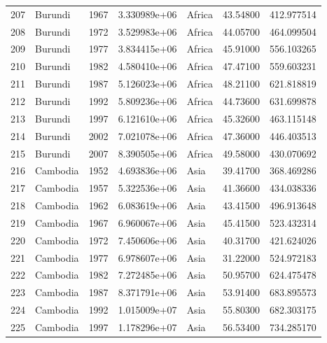 \documentclass[
  letterpaper,
  DIV=11,
  numbers=noendperiod]{scrreprt}
\begin{document}
\begin{tabular}{llrrlrr}
207  &                   Burundi &  1967 &  3.330989e+06 &    Africa &  43.54800 &     412.977514 \\
208  &                   Burundi &  1972 &  3.529983e+06 &    Africa &  44.05700 &     464.099504 \\
209  &                   Burundi &  1977 &  3.834415e+06 &    Africa &  45.91000 &     556.103265 \\
210  &                   Burundi &  1982 &  4.580410e+06 &    Africa &  47.47100 &     559.603231 \\
211  &                   Burundi &  1987 &  5.126023e+06 &    Africa &  48.21100 &     621.818819 \\
212  &                   Burundi &  1992 &  5.809236e+06 &    Africa &  44.73600 &     631.699878 \\
213  &                   Burundi &  1997 &  6.121610e+06 &    Africa &  45.32600 &     463.115148 \\
214  &                   Burundi &  2002 &  7.021078e+06 &    Africa &  47.36000 &     446.403513 \\
215  &                   Burundi &  2007 &  8.390505e+06 &    Africa &  49.58000 &     430.070692 \\
216  &                  Cambodia &  1952 &  4.693836e+06 &      Asia &  39.41700 &     368.469286 \\
217  &                  Cambodia &  1957 &  5.322536e+06 &      Asia &  41.36600 &     434.038336 \\
218  &                  Cambodia &  1962 &  6.083619e+06 &      Asia &  43.41500 &     496.913648 \\
219  &                  Cambodia &  1967 &  6.960067e+06 &      Asia &  45.41500 &     523.432314 \\
220  &                  Cambodia &  1972 &  7.450606e+06 &      Asia &  40.31700 &     421.624026 \\
221  &                  Cambodia &  1977 &  6.978607e+06 &      Asia &  31.22000 &     524.972183 \\
222  &                  Cambodia &  1982 &  7.272485e+06 &      Asia &  50.95700 &     624.475478 \\
223  &                  Cambodia &  1987 &  8.371791e+06 &      Asia &  53.91400 &     683.895573 \\
224  &                  Cambodia &  1992 &  1.015009e+07 &      Asia &  55.80300 &     682.303175 \\
225  &                  Cambodia &  1997 &  1.178296e+07 &      Asia &  56.53400 &     734.285170 \\

\end{tabular}
\end{document}
